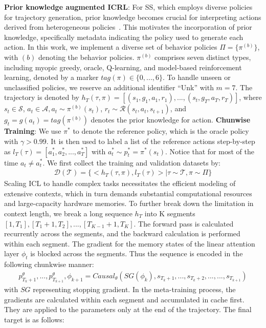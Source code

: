 \documentclass{article}
\begin{document}
\textbf{Prior knowledge augmented ICRL}: For SS, which employs diverse policies for trajectory generation, prior knowledge becomes crucial for interpreting actions derived from heterogeneous policies~\citep{chen2021decision}. This motivates the incorporation of prior knowledge, specifically metadata indicating the policy used to generate each action. In this work, we implement a diverse set of behavior policies $\Pi=\{\pi^{(b)}\}$, with $(b)$ denoting the behavior policies. $\pi^{(b)}$ comprises seven distinct types, including myopic greedy, oracle, Q-learning, and model-based reinforcement learning, denoted by a marker $tag(\pi)\in\{0,...,6\}$. To handle unseen or unclassified policies, we reserve an additional identifier ``Unk'' with $m=7$. The trajectory is denoted by $h_{T}(\tau,\pi)=[(s_1, g_1, a_1, r_1), ..., (s_t, g_{T}, a_{T}, r_{T})]$, where $s_t \in \mathcal{S}$, $a_t \in \mathcal{A}, a_t \sim \pi^{(b)}(s_t)$, $r_t \sim \mathcal{R}(s_t,a_t, s_{t+1})$, and $g_t=g(a_t)=tag(\pi^{(b)})$ denotes the prior knowledge for action.
\textbf{Chunwise Training}: We use $\pi^*$ to denote the reference policy, which is the oracle policy with $\gamma>0.99$. It is then used to label a list of the reference actions step-by-step as $l_T(\tau)=[a^{*}_1, a^{*}_2,..., a^{*}_T]$ with $a^{*}_t \sim p^{*}_t = \pi^*(s_t)$. Notice that for most of the time $a_t \neq a^*_t$.
We first collect the training and validation datasets by:
\begin{align}
\mathcal{D}(\mathcal{T})=\{<h_T(\tau,\pi),l_T(\tau)>| \tau \sim \mathcal{T}, \pi \sim \Pi \}
\end{align}
Scaling ICL to handle complex tasks necessitates the efficient modeling of extensive contexts, which in turn demands substantial computational resources and large-capacity hardware memories. To further break down the limitation in context length, we break a long sequence $h_T$ into K segments $[1,T_1], [T_1+1,T_2],...,[T_{K-1}+1,T_K]$. The forward pass is calculated recurrently across the segments, and the backward calculation is performed within each segment. The gradient for the memory states of the linear attention layer $\phi_t$ is blocked across the segments. Thus the sequence is encoded in the following chunkwise manner:
\begin{align}
p^{\theta}_{T_k+1}, ..., p^{\theta}_{T_{k+1}},\phi_{k+1}=Causal_{\theta}(SG(\phi_{k}),s_{T_k+1}, ...,s_{T_k+2},...,...,s_{T_{k+1}})
\label{eq:chunkwise_forward}
\end{align}
with $SG$ representing stopping gradient. In the meta-training process, the gradients are calculated within each segment and accumulated in cache first. They are applied to the parameters only at the end of the trajectory. The final target is as follows:
\end{document}
